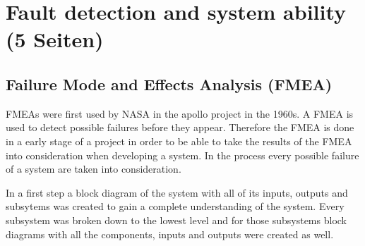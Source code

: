 \documentclass[ExampleMasters.tex]{subfiles}
\begin{document}
\clearpage


\chapter{Fault detection and system ability (5 Seiten)}
\label{chap:fault_detection}
\section{Failure Mode and Effects Analysis (FMEA)}
\label{sec:FMEA}
FMEAs were first used by NASA in the apollo project in the 1960s.
A FMEA is used to detect possible failures before they appear. Therefore the FMEA is done in a early stage of a project in order to be able to take the results of the FMEA into consideration when developing a system. In the process every possible failure of a system are taken into consideration. 

In a first step a block diagram of the system with all of its inputs, outputs and subsytems was created to gain a complete understanding of the system. Every subsystem was broken down to the lowest level and for those subsystems block diagrams with all the components, inputs and outputs were created as well.
\end{document}
